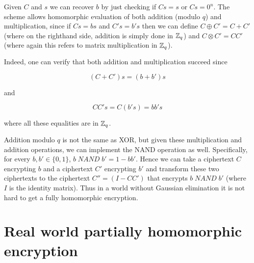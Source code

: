 Given \(C\) and \(s\) we can recover \(b\) by just checking if \(Cs=s\)
or \(Cs=0^n\). The scheme allows homomorphic evaluation of both addition
(modulo \(q\)) and multiplication, since if \(Cs = bs\) and \(C's=b's\)
then we can define \(C \oplus C' = C + C'\) (where on the righthand
side, addition is simply done in \({\mathbb{Z}}_q\)) and
\(C\otimes C' = \ensuremath{\mathit{CC}}'\) (where again this refers to
matrix multiplication in \({\mathbb{Z}}_q\)).

Indeed, one can verify that both addition and multiplication succeed
since

\[(C+C')s = (b+b')s\]

and

\[\ensuremath{\mathit{CC}}'s = C(b's) = bb's\]

where all these equalities are in \({\mathbb{Z}}_q\).

Addition modulo \(q\) is not the same as XOR, but given these
multiplication and addition operations, we can implement the NAND
operation as well. Specifically, for every \(b,b' \in \{0,1\}\),
\(b \; \ensuremath{\mathit{NAND}} \; b' = 1-bb'\). Hence we can take a
ciphertext \(C\) encrypting \(b\) and a ciphertext \(C'\) encrypting
\(b'\) and transform these two ciphertexts to the ciphertext
\(C''=(I-CC')\) that encrypts \(b\; \ensuremath{\mathit{NAND}} \; b'\)
(where \(I\) is the identity matrix). Thus in a world without Gaussian
elimination it is not hard to get a fully homomorphic encryption.

\hypertarget{privkeyfhe}{}

\section{Real world partially homomorphic
encryption}\label{Real-world-partially-homo}

